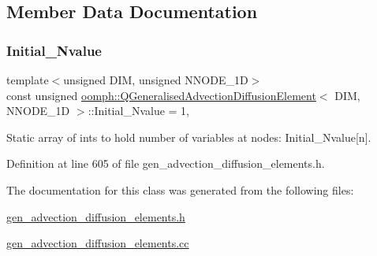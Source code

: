 \subsection{Member Data Documentation}
\mbox{\label{classoomph_1_1QGeneralisedAdvectionDiffusionElement_a2ea29796b838cb53f0cfbc99a377274c}} 
\subsubsection{\texorpdfstring{Initial\+\_\+\+Nvalue}{Initial\_Nvalue}}
{\footnotesize\ttfamily template$<$unsigned D\+IM, unsigned N\+N\+O\+D\+E\+\_\+1D$>$ \\
const unsigned \hyperlink{classoomph_1_1QGeneralisedAdvectionDiffusionElement}{oomph\+::\+Q\+Generalised\+Advection\+Diffusion\+Element}$<$ D\+IM, N\+N\+O\+D\+E\+\_\+1D $>$\+::Initial\+\_\+\+Nvalue = 1\hspace{0.3cm}{\ttfamily [static]}, {\ttfamily [private]}}



Static array of ints to hold number of variables at nodes\+: Initial\+\_\+\+Nvalue\mbox{[}n\mbox{]}. 



Definition at line 605 of file gen\+\_\+advection\+\_\+diffusion\+\_\+elements.\+h.



The documentation for this class was generated from the following files\+:\begin{DoxyCompactItemize}
\item 
\hyperlink{gen__advection__diffusion__elements_8h}{gen\+\_\+advection\+\_\+diffusion\+\_\+elements.\+h}\item 
\hyperlink{gen__advection__diffusion__elements_8cc}{gen\+\_\+advection\+\_\+diffusion\+\_\+elements.\+cc}\end{DoxyCompactItemize}
